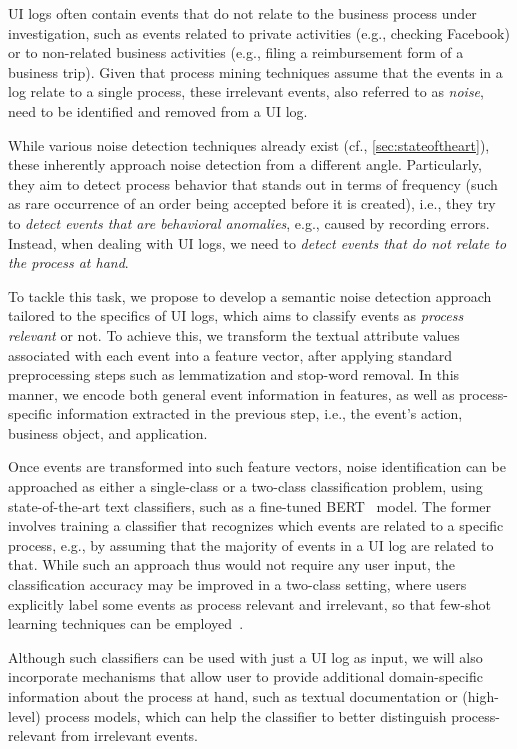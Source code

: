 UI logs often contain events that do not relate to the business process under investigation, such as events related to private activities (e.g., checking Facebook) or to non-related business activities (e.g., filing a reimbursement form of a business trip).
Given that process mining techniques assume that the events in a log relate to a single process, these irrelevant events, also referred to as \emph{noise}, need to be identified and removed from a UI log.

While various noise detection techniques already exist (cf., \autoref{sec:stateoftheart}), these  inherently approach noise detection from a different angle. Particularly, they aim to detect process behavior that stands out in terms of frequency (such as rare occurrence of an order being accepted before it is created), i.e., they try to \emph{detect events that are behavioral anomalies}, e.g., caused by recording errors.
Instead, when dealing with UI logs, we need to \emph{detect events that do not relate to the process at hand}. 

To tackle this task, we propose to develop a semantic noise detection approach tailored to the specifics of UI logs, which aims to classify events as \emph{process relevant} or not. 
To achieve this, we transform the textual attribute values associated with each event  into a feature vector, after applying standard preprocessing steps such as lemmatization and stop-word removal. In this manner, we encode both general event information in features, as well as process-specific information extracted in the previous step, i.e., the event's action, business object, and application.

Once events are transformed into such feature vectors, noise identification can be approached as either a single-class or a two-class classification problem, using state-of-the-art text classifiers, such as a fine-tuned BERT~\cite{Devlin2019} model. The former involves training a classifier that recognizes which events are related to a specific process, e.g., by assuming that the majority of events in a UI log are related to that. While such an approach thus would not require any user input, the classification accuracy may be improved in a two-class setting, where users explicitly label some events as process relevant and irrelevant, so that few-shot learning techniques can be employed~\cite{yu2018diverse}.

Although such classifiers can be used with just a UI log as input, we will also incorporate mechanisms that allow user to provide additional domain-specific information about the process at hand, such as textual documentation or (high-level) process models, which can help the classifier to better distinguish process-relevant from irrelevant events.

